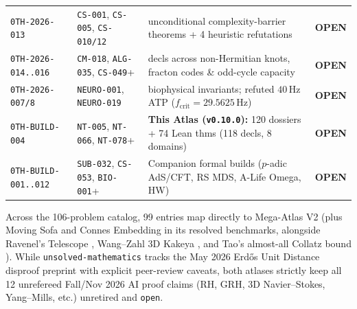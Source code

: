 \documentclass[11pt,reqno]{amsart}
\theoremstyle{plain}
\theoremstyle{definition}
\newcommand{\code}[1]{{\upshape\nolinkurl{#1}}}
\begin{document}
\begin{table}[htbp]
\begin{tabularx}{\textwidth}{@{}ll>{\raggedright\arraybackslash}Xl@{}}
\code{0TH-2026-013} & \code{CS-001}, \code{CS-005}, \code{CS-010/12} & 14 unconditional complexity-barrier theorems + 4 heuristic refutations & \textbf{OPEN} \\
\code{0TH-2026-014..016} & \code{CM-018}, \code{ALG-035}, \code{CS-049}+ & 150 decls across non-Hermitian knots, fracton codes \& odd-cycle capacity & \textbf{OPEN} \\
\code{0TH-2026-007/8} & \code{NEURO-001}, \code{NEURO-019} & 24 biophysical invariants; refuted $40$\,Hz ATP ($f_{\mathrm{crit}}=29.5625$\,Hz) & \textbf{OPEN} \\
\code{0TH-BUILD-004} & \code{NT-005}, \code{NT-066}, \code{NT-078}+ & \textbf{This Atlas (\texttt{v0.10.0}):} 120 dossiers + 74 Lean thms (118 decls, 8 domains) & \textbf{OPEN} \\
\code{0TH-BUILD-001..012} & \code{SUB-032}, \code{CS-053}, \code{BIO-001}+ & Companion formal builds ($p$-adic AdS/CFT, RS MDS, A-Life Omega, HW) & \textbf{OPEN} \\
\bottomrule
\end{tabularx}
\end{table}

Across the 106-problem catalog, 99 entries map directly to Mega-Atlas V2 (plus Moving Sofa and
Connes Embedding \cite{ji2020mip} in its resolved benchmarks, alongside Ravenel's Telescope
\cite{burklund2023telescope}, Wang--Zahl 3D Kakeya \cite{wangzahl2025}, and Tao's almost-all
Collatz bound \cite{tao2022collatz}). While \code{unsolved-mathematics} tracks the May 2026
Erd\H{o}s Unit Distance disproof preprint \cite{unitdistance2026} with explicit peer-review
caveats, both atlases strictly keep all 12 unrefereed Fall/Nov 2026 AI proof claims (RH, GRH,
3D Navier--Stokes, Yang--Mills, etc.) unretired and \code{open}.
\end{document}
